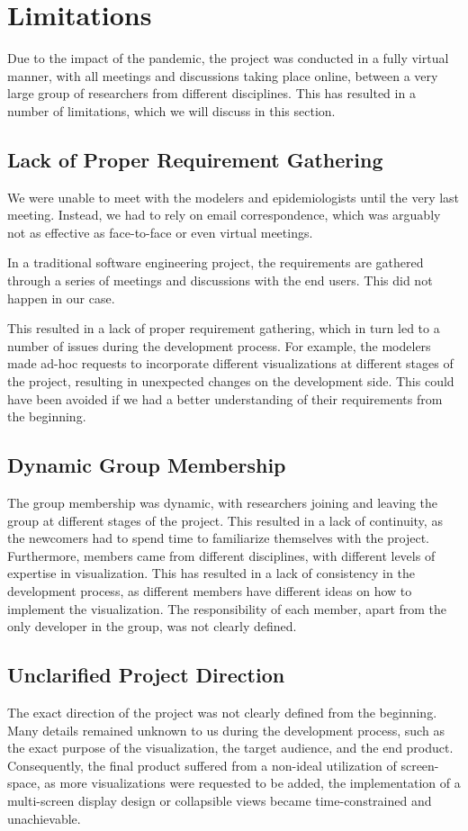 \section{Limitations}

Due to the impact of the pandemic, the project was conducted in a fully virtual manner, with all meetings and discussions taking place online, between a very large group of researchers from different disciplines. This has resulted in a number of limitations, which we will discuss in this section.

\subsection{Lack of Proper Requirement Gathering}
We were unable to meet with the modelers and epidemiologists until the very last meeting. Instead, we had to rely on email correspondence, which was arguably not as effective as face-to-face or even virtual meetings.

In a traditional software engineering project, the requirements are gathered through a series of meetings and discussions with the end users. This did not happen in our case.

This resulted in a lack of proper requirement gathering, which in turn led to a number of issues during the development process.
For example, the modelers made ad-hoc requests to incorporate different visualizations at different stages of the project, resulting in unexpected changes on the development side.
This could have been avoided if we had a better understanding of their requirements from the beginning.

\subsection{Dynamic Group Membership}

The group membership was dynamic, with researchers joining and leaving the group at different stages of the project.
This resulted in a lack of continuity, as the newcomers had to spend time to familiarize themselves with the project.
Furthermore, members came from different disciplines, with different levels of expertise in visualization.
This has resulted in a lack of consistency in the development process, as different members have different ideas on how to implement the visualization.
The responsibility of each member, apart from the only developer in the group, was not clearly defined.

\subsection{Unclarified Project Direction}

The exact direction of the project was not clearly defined from the beginning.
Many details remained unknown to us during the development process, such as the exact purpose of the visualization, the target audience, and the end product. 
Consequently, the final product suffered from a non-ideal utilization of screen-space, as more visualizations were requested to be added, the implementation of a multi-screen display design or collapsible views became time-constrained and unachievable.
